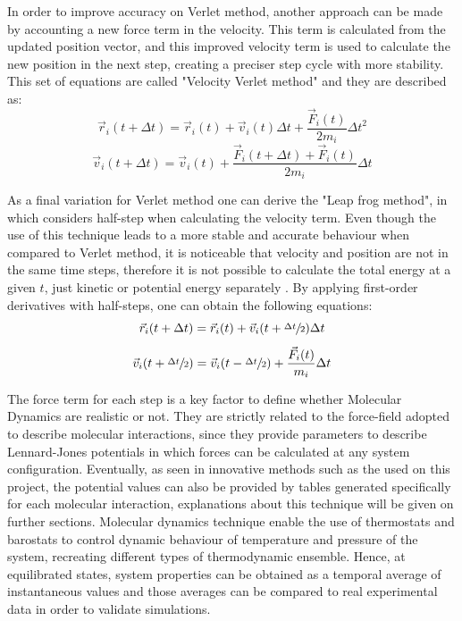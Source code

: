 \documentclass[10pt,a4paper,twoside]{article}
\begin{document}
In order to improve accuracy on Verlet method, another approach can be made by accounting a new force term in the velocity. This term is calculated from the updated position vector, and this improved velocity term is used to calculate the new position in the next step, creating a preciser step cycle with more stability\cite{satoh}. This set of equations are called "Velocity Verlet method" and they are described as:
\begin{equation}
\vec{r}_i(t+\Delta t) = \vec{r}_i(t) + \vec{v}_i(t)\Delta t + \dfrac{\vec{F}_i(t)}{2m_i}{\Delta t}^2
\label{eqn:vverletr}
\end{equation}
\begin{equation}
\vec{v}_i(t+\Delta t) = \vec{v}_i(t) + \dfrac{\vec{F}_i(t+\Delta t)+\vec{F}_i(t)}{2m_i}\Delta t
\label{eqn:vverletv}
\end{equation}

As a final variation for Verlet method one can derive the "Leap frog method", in which considers half-step when calculating the velocity term. Even though the use of this technique leads to a more stable and accurate behaviour when compared to Verlet method, it is noticeable that velocity and position are not in the same time steps, therefore it is not possible to calculate the total energy at a given $t$, just kinetic or potential energy separately \cite{umd}. By applying first-order derivatives with half-steps, one can obtain the following equations:
\begin{equation}
\vec{r}_i(t+\Delta t) = \vec{r}_i(t) + \vec{v}_i(t+\sfrac{\Delta t}{2})\Delta t
\label{eqn:leapfrogr}
\end{equation}
\begin{equation}
\vec{v}_i(t+\sfrac{\Delta t}{2}) = \vec{v}_i(t-\sfrac{\Delta t}{2}) + \dfrac{\vec{F}_i(t)}{m_i}\Delta t
\label{eqn:leapfrogv}
\end{equation}

The force term for each step is a key factor to define whether Molecular Dynamics are realistic or not. They are strictly related to the force-field adopted to describe molecular interactions, since they provide parameters to describe Lennard-Jones potentials in which forces can be calculated at any system configuration. Eventually, as seen in innovative methods such as the used on this project, the potential values can also be provided by tables generated specifically for each molecular interaction, explanations about this technique will be given on further sections. Molecular dynamics technique enable the use of thermostats and barostats to control dynamic behaviour of temperature and pressure of the system, recreating different types of thermodynamic ensemble. Hence, at equilibrated states, system properties can be obtained as a temporal average of instantaneous values and those averages can be compared to real experimental data in order to validate simulations.
\end{document}
